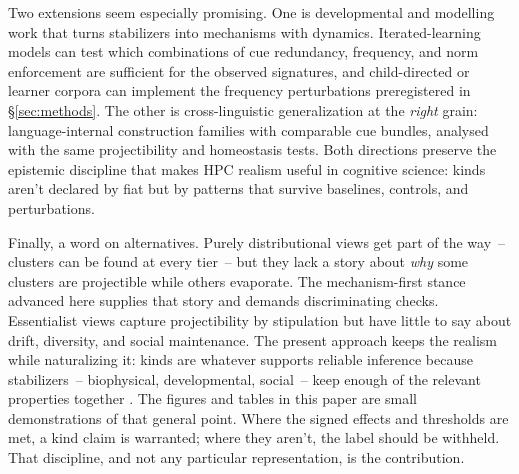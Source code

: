 \documentclass[12pt]{article}
\begin{document}
Two extensions seem especially promising. One is developmental and modelling work that turns stabilizers into mechanisms with dynamics. Iterated-learning models can test which combinations of cue redundancy, frequency, and norm enforcement are sufficient for the observed signatures, and child-directed or learner corpora can implement the frequency perturbations preregistered in \S\ref{sec:methods}. The other is cross-linguistic generalization at the \emph{right} grain: language-internal construction families with comparable cue bundles, analysed with the same projectibility and homeostasis tests. Both directions preserve the epistemic discipline that makes \textsc{HPC} realism useful in cognitive science: kinds aren't declared by fiat but by patterns that survive baselines, controls, and perturbations.

Finally, a word on alternatives. Purely distributional views get part of the way~-- clusters can be found at every tier~-- but they lack a story about \emph{why} some clusters are projectible while others evaporate. The mechanism-first stance advanced here supplies that story and demands discriminating checks. Essentialist views capture projectibility by stipulation but have little to say about drift, diversity, and social maintenance. The present approach keeps the realism while naturalizing it: kinds are whatever supports reliable inference because stabilizers~-- biophysical, developmental, social~-- keep enough of the relevant properties together \citep{Miller2021WordsSpeciesKinds,Boyd1991Enthusiasm,Boyd1999Homeostasis}. The figures and tables in this paper are small demonstrations of that general point. Where the signed effects and thresholds are met, a kind claim is warranted; where they aren't, the label should be withheld. That discipline, and not any particular representation, is the contribution.


\clearpage


\end{document}
